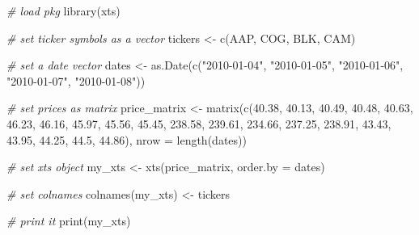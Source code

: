 \documentclass[
  12pt,
]{book}
\newenvironment{Shaded}{\begin{snugshade}}{\end{snugshade}}
\newcommand{\AttributeTok}[1]{\textcolor[rgb]{0.61,0.61,0.61}{#1}}
\newcommand{\CommentTok}[1]{\textcolor[rgb]{0.37,0.37,0.37}{\textit{#1}}}
\newcommand{\FloatTok}[1]{\textcolor[rgb]{0.06,0.06,0.06}{#1}}
\newcommand{\FunctionTok}[1]{\textcolor[rgb]{0,0,0}{#1}}
\newcommand{\NormalTok}[1]{#1}
\newcommand{\OtherTok}[1]{\textcolor[rgb]{0.37,0.37,0.37}{#1}}
\newcommand{\StringTok}[1]{\textcolor[rgb]{0.5,0.5,0.5}{#1}}
\begin{document}
\begin{Shaded}
\begin{Highlighting}[]
\CommentTok{\# load pkg}
\FunctionTok{library}\NormalTok{(xts)}

\CommentTok{\# set ticker symbols as a vector}
\NormalTok{tickers }\OtherTok{\textless{}{-}} \FunctionTok{c}\NormalTok{(}\StringTok{\textquotesingle{}AAP\textquotesingle{}}\NormalTok{, }\StringTok{\textquotesingle{}COG\textquotesingle{}}\NormalTok{, }\StringTok{\textquotesingle{}BLK\textquotesingle{}}\NormalTok{, }\StringTok{\textquotesingle{}CAM\textquotesingle{}}\NormalTok{)}

\CommentTok{\# set a date vector}
\NormalTok{dates }\OtherTok{\textless{}{-}} \FunctionTok{as.Date}\NormalTok{(}\FunctionTok{c}\NormalTok{(}\StringTok{"2010{-}01{-}04"}\NormalTok{, }\StringTok{"2010{-}01{-}05"}\NormalTok{, }\StringTok{"2010{-}01{-}06"}\NormalTok{, }
                   \StringTok{"2010{-}01{-}07"}\NormalTok{, }\StringTok{"2010{-}01{-}08"}\NormalTok{))}

\CommentTok{\# set prices as  matrix                   }
\NormalTok{price\_matrix }\OtherTok{\textless{}{-}} \FunctionTok{matrix}\NormalTok{(}\FunctionTok{c}\NormalTok{(}\FloatTok{40.38}\NormalTok{,  }\FloatTok{40.13}\NormalTok{,  }\FloatTok{40.49}\NormalTok{,  }\FloatTok{40.48}\NormalTok{,  }\FloatTok{40.63}\NormalTok{,}
                         \FloatTok{46.23}\NormalTok{,  }\FloatTok{46.16}\NormalTok{,  }\FloatTok{45.97}\NormalTok{,  }\FloatTok{45.56}\NormalTok{,  }\FloatTok{45.45}\NormalTok{,}
                         \FloatTok{238.58}\NormalTok{, }\FloatTok{239.61}\NormalTok{, }\FloatTok{234.66}\NormalTok{, }\FloatTok{237.25}\NormalTok{, }\FloatTok{238.91}\NormalTok{,}
                         \FloatTok{43.43}\NormalTok{,  }\FloatTok{43.95}\NormalTok{,  }\FloatTok{44.25}\NormalTok{,  }\FloatTok{44.5}\NormalTok{,   }\FloatTok{44.86}\NormalTok{),}
                       \AttributeTok{nrow =} \FunctionTok{length}\NormalTok{(dates))}

\CommentTok{\# set xts object}
\NormalTok{my\_xts }\OtherTok{\textless{}{-}} \FunctionTok{xts}\NormalTok{(price\_matrix, }\AttributeTok{order.by =}\NormalTok{ dates)}

\CommentTok{\# set colnames}
\FunctionTok{colnames}\NormalTok{(my\_xts) }\OtherTok{\textless{}{-}}\NormalTok{ tickers}

\CommentTok{\# print it}
\FunctionTok{print}\NormalTok{(my\_xts)}
\end{Highlighting}
\end{Shaded}
\end{document}
